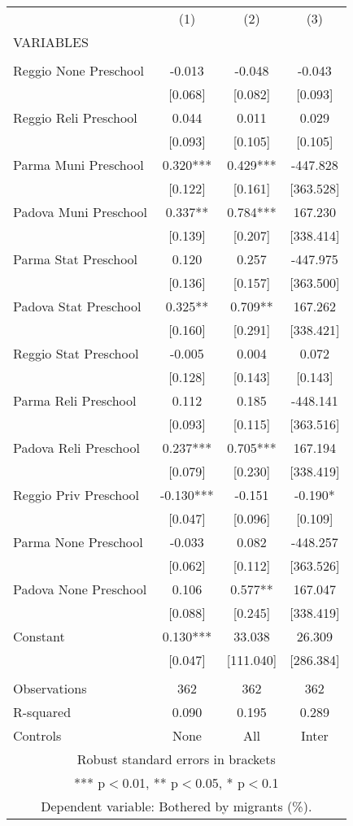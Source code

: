 \begin{tabular}{lccc} \hline
 & (1) & (2) & (3) \\
VARIABLES &  &  &  \\ \hline
 &  &  &  \\
Reggio None Preschool & -0.013 & -0.048 & -0.043 \\
 & [0.068] & [0.082] & [0.093] \\
Reggio Reli Preschool & 0.044 & 0.011 & 0.029 \\
 & [0.093] & [0.105] & [0.105] \\
Parma Muni Preschool & 0.320*** & 0.429*** & -447.828 \\
 & [0.122] & [0.161] & [363.528] \\
Padova Muni Preschool & 0.337** & 0.784*** & 167.230 \\
 & [0.139] & [0.207] & [338.414] \\
Parma Stat Preschool & 0.120 & 0.257 & -447.975 \\
 & [0.136] & [0.157] & [363.500] \\
Padova Stat Preschool & 0.325** & 0.709** & 167.262 \\
 & [0.160] & [0.291] & [338.421] \\
Reggio Stat Preschool & -0.005 & 0.004 & 0.072 \\
 & [0.128] & [0.143] & [0.143] \\
Parma Reli Preschool & 0.112 & 0.185 & -448.141 \\
 & [0.093] & [0.115] & [363.516] \\
Padova Reli Preschool & 0.237*** & 0.705*** & 167.194 \\
 & [0.079] & [0.230] & [338.419] \\
Reggio Priv Preschool & -0.130*** & -0.151 & -0.190* \\
 & [0.047] & [0.096] & [0.109] \\
Parma None Preschool & -0.033 & 0.082 & -448.257 \\
 & [0.062] & [0.112] & [363.526] \\
Padova None Preschool & 0.106 & 0.577** & 167.047 \\
 & [0.088] & [0.245] & [338.419] \\
Constant & 0.130*** & 33.038 & 26.309 \\
 & [0.047] & [111.040] & [286.384] \\
 &  &  &  \\
Observations & 362 & 362 & 362 \\
R-squared & 0.090 & 0.195 & 0.289 \\
 Controls & None & All & Inter \\ \hline
\multicolumn{4}{c}{ Robust standard errors in brackets} \\
\multicolumn{4}{c}{ *** p$<$0.01, ** p$<$0.05, * p$<$0.1} \\
\multicolumn{4}{c}{ Dependent variable: Bothered by migrants (\%).} \\
\end{tabular}
